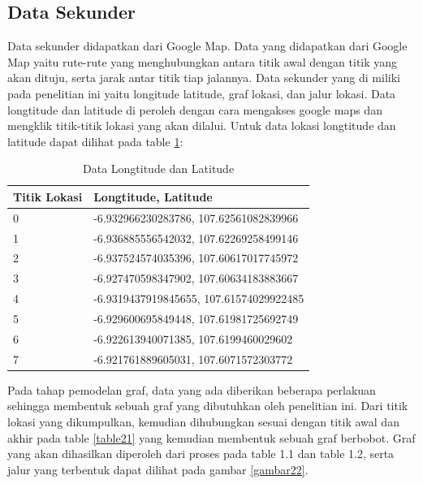     
    
    
    
\subsection{Data Sekunder}
\par Data sekunder didapatkan dari Google Map. Data yang didapatkan dari Google Map yaitu rute-rute yang menghubungkan antara titik awal dengan titik yang akan dituju, serta jarak antar titik tiap jalannya. Data sekunder yang di miliki pada penelitian ini yaitu longitude latitude, graf lokasi, dan jalur lokasi. Data longtitude dan latitude di peroleh dengan cara mengakses google maps dan mengklik titik-titik lokasi yang akan dilalui. Untuk data lokasi longtitude dan latitude dapat dilihat pada table \ref{table22}:
    
\begin{table}[!htbp]
    \centering
    \caption{Data Longtitude dan Latitude}
    \label{table22}
    \begin{tabular}{|l|l|}
    \hline
        Titik Lokasi & Longtitude, Latitude \\
    \hline
        0 & -6.932966230283786, 107.62561082839966 \\
    \hline
        1 & -6.936885556542032, 107.62269258499146 \\
    \hline
        2 & -6.937524574035396, 107.60617017745972 \\
    \hline
        3 & -6.927470598347902, 107.60634183883667 \\
    \hline
        4 & -6.9319437919845655, 107.61574029922485 \\
    \hline
        5 & -6.929600695849448, 107.61981725692749 \\
    \hline
        6 & -6.922613940071385, 107.6199460029602 \\
    \hline
        7 & -6.921761889605031, 107.6071572303772 \\
    \hline
    \end{tabular}
\end{table}
    
\par Pada  tahap  pemodelan  graf,  data  yang  ada  diberikan  beberapa  perlakuan sehingga  membentuk  sebuah  graf  yang  dibutuhkan  oleh  penelitian  ini. Dari titik lokasi yang dikumpulkan, kemudian dihubungkan sesuai dengan titik awal dan akhir pada table \ref{table21} yang kemudian membentuk sebuah graf berbobot. Graf yang akan dihasilkan diperoleh dari proses pada table 1.1 dan table 1.2, serta jalur yang terbentuk dapat dilihat pada gambar \ref{gambar22}.
    
